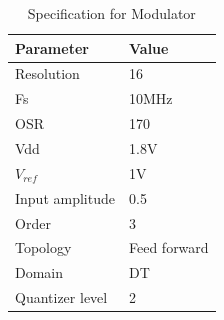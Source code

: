 \begin{table}[H]
\centering
\caption{Specification for Modulator}
\label{spec}
\begin{tabular}{@{}ll@{}}
\toprule
Parameter       & Value        \\ \midrule
Resolution      & 16           \\
Fs              & 10MHz        \\
OSR             & 170          \\
Vdd             & 1.8V         \\
$V_{ref}$          & 1V           \\
Input amplitude & 0.5          \\
Order           & 3            \\
Topology        & Feed forward \\
Domain          & DT           \\
Quantizer level & 2            \\ \bottomrule
\end{tabular}
\end{table}